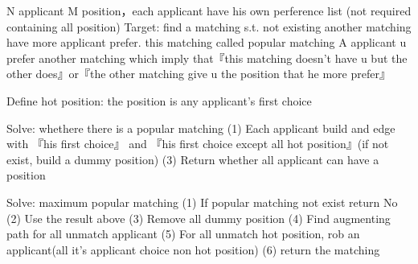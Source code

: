 N applicant M position，each applicant have his own perference list (not required containing all position)
Target: find a matching s.t. not existing another matching have more applicant prefer. this matching called popular matching
A applicant u prefer another matching which imply that『this matching doesn't have u but the other does』or『the other matching give u the position that he more prefer』

Define hot position: the position is any applicant's first choice

Solve: whethere there is a popular matching
(1) Each applicant build and edge with 『his first choice』 and 『his first choice except all hot position』(if not exist, build a dummy position)
(3) Return whether all applicant can have a position

Solve: maximum popular matching
(1) If popular matching not exist return No
(2) Use the result above
(3) Remove all dummy position
(4) Find augmenting path for all unmatch applicant
(5) For all unmatch hot position, rob an applicant(all it's applicant choice non hot position)
(6) return the matching
